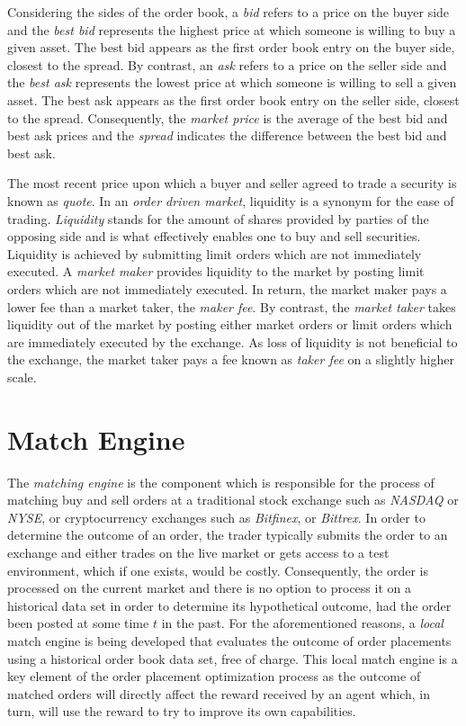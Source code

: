 Considering the sides of the order book, a \textit{bid} refers to a price on the buyer side and the \textit{best bid} represents the highest price at which someone is willing to buy a given asset.
The best bid appears as the first order book entry on the buyer side, closest to the spread.
By contrast, an \textit{ask} refers to a price on the seller side and the \textit{best ask} represents the lowest price at which someone is willing to sell a given asset. 
The best ask appears as the first order book entry on the seller side, closest to the spread.
Consequently, the \textit{market price} is the average of the best bid and best ask prices and the \textit{spread} indicates the difference between the best bid and best ask.

The most recent price upon which a buyer and seller agreed to trade a security is known as \textit{quote}.
In an \textit{order driven market}, liquidity is a synonym for the ease of trading.
\textit{Liquidity} stands for the amount of shares provided by parties of the opposing side and is what effectively enables one to buy and sell securities.
Liquidity is achieved by submitting limit orders which are not immediately executed.
A \textit{market maker} provides liquidity to the market by posting limit orders which are not immediately executed.
In return, the market maker pays a lower fee than a market taker, the \textit{maker fee}.
By contrast, the \textit{market taker} takes liquidity out of the market by posting either market orders or limit orders which are immediately executed by the exchange.
As loss of liquidity is not beneficial to the exchange, the market taker pays a fee known as \textit{taker fee} on a slightly higher scale.

\section{Match Engine}
\label{sec:match-engine}

The \textit{matching engine} is the component which is responsible for the process of matching buy and sell orders at a traditional stock exchange such as \textit{NASDAQ} or \textit{NYSE}, or cryptocurrency exchanges such as \textit{Bitfinex}, or \textit{Bittrex}.
In order to determine the outcome of an order, the trader typically submits the order to an exchange and either trades on the live market or gets access to a test environment, which if one exists, would be costly.
Consequently, the order is processed on the current market and there is no option to process it on a historical data set in order to determine its hypothetical outcome, had the order been posted at some time $t$ in the past.
For the aforementioned reasons, a \textit{local} match engine is being developed that evaluates the outcome of order placements using a historical order book data set, free of charge.
This local match engine is a key element of the order placement optimization process as the outcome of matched orders will directly affect the reward received by an agent which, in turn, will use the reward to try to improve its own capabilities.

